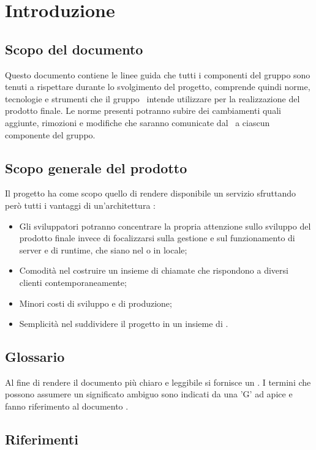 \section{Introduzione}\label{Introduzione}
\subsection{Scopo del documento}\label{ScopoDocumento}
Questo documento contiene le linee guida che tutti i componenti del gruppo sono tenuti a rispettare durante lo svolgimento del progetto, comprende quindi norme, tecnologie e strumenti che il gruppo \Gruppo\ intende utilizzare per la realizzazione del prodotto finale. 
Le norme presenti potranno subire dei cambiamenti quali aggiunte, rimozioni e modifiche che saranno comunicate dal \Responsabile\ a ciascun componente del gruppo.

\subsection{Scopo generale del prodotto}
Il progetto {\NomeProgetto} ha come scopo quello di rendere disponibile un servizio  sfruttando però tutti i vantaggi di un'architettura :
\begin{itemize}
    \item Gli sviluppatori potranno concentrare la propria attenzione sullo sviluppo del prodotto finale invece di focalizzarsi sulla gestione e sul funzionamento di server e di runtime, che siano nel  o in locale;
    \item Comodità nel costruire un insieme di chiamate  che rispondono a diversi clienti contemporaneamente;
    \item Minori costi di sviluppo e di produzione;
    \item Semplicità nel suddividere il progetto in un insieme di .
\end{itemize}

\subsection{Glossario}\label{Glossario}
Al fine di rendere il documento più chiaro e leggibile si fornisce un \Glossario{}. I termini che possono assumere un significato ambiguo sono indicati da una 'G' ad apice e fanno riferimento al documento .

\subsection{Riferimenti}
